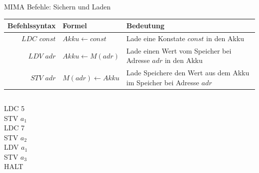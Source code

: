 \begin{frame}{MIMA Befehle: Sichern und Laden}
	\begin{tabular}{r | l p{5cm} }
		Befehlssyntax & Formel & Bedeutung\\\hline\hline 
		$LDC$ $const$ & $Akku \leftarrow const$ & Lade eine Konstate $const$ in den Akku \\\hline 
		$LDV$ $adr$ & $Akku \leftarrow M(adr)$ & Lade einen Wert vom Speicher bei Adresse $adr$ in den Akku\\\hline
		$STV$ $adr$ & $M(adr) \leftarrow Akku$ & Lade Speichere den Wert aus dem Akku im Speicher bei Adresse $adr$\\\hline
	\end{tabular}

	\bp 
	\vspace{.5cm}
	\vspace{.2cm}
	
	\begin{columns}
		\begin{column}{0.5\textwidth}
			LDC 5 \\ STV $a_1$ \\ LDC 7 \\ STV $a_2$ \\ LDV $a_1$ \\ STV $a_3$ \\ HALT
		\end{column}
		
		\begin{column}{0.5\textwidth}
			\begin{memory}
			\end{memory}
		\end{column}
	\end{columns}

\end{frame}

